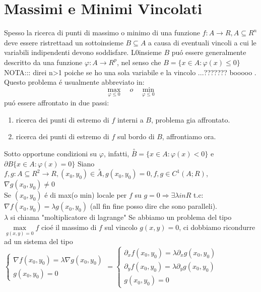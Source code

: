 \section{Massimi e Minimi Vincolati}
Spesso la ricerca di punti di massimo o minimo di una funzione $f:A\rightarrow R, A\subseteq R^n$ deve essere ristrettaad un sottoinsieme $B\subseteq A$ a causa di eventuali vincoli a cui le variabili indipendenti devono soddisfare. L0insieme $B$ pu\'o essere generalmente descritto da una funzione $\varphi :A\rightarrow R^p$, nel senso che $B=\{x\in A:\varphi (x)\le 0\}$\\
NOTA::: direi n>1 poiche se ho una sola variabile e la vincolo ...??????? booooo .\\
Questo problema \'e usualmente abbreviato in:
$$\max\limits_{\varphi \le 0}\quad o \quad\min\limits_{\varphi \le 0}$$
pu\'o essere affrontato in due passi:\\
\begin{enumerate}
	\item ricerca dei punti di estremo di $f$ interni a $B$, problema gia affrontato.
	\item ricerca dei punti di estremo di $f$ sul bordo di $B$, affrontiamo ora.
\end{enumerate}
Sotto opportune condizioni su $\varphi$, infatti, $\overset{\circ}{B} = \{x\in A:\varphi(x)<0\}$ e $\partial B\{x\in A:\varphi(x)=0\}$
Siano $f,g:A\subseteq R^2\rightarrow R, (x_0,y_0)\in\overset{\circ}{A}, g(x_0,y_0)=0, f,g\in C^1(A;R)$, $\nabla g (x_0,y_0)\ne 0$\\
Se $(x_0,y_0)$ \'e di max(o min) locale per $f$ su $g=0\Rightarrow\exists \lambda in R$ t.c: $\nabla f(x_0,y_0) = \lambda g(x_0,y_0)$ (all fin fine posso dire che sono paralleli).\\
\observation
$\lambda$ si chiama "moltiplicatore di lagrange"
\observation
Se abbiamo un problema del tipo $\max\limits_{g(x,y)=0}f$ cio\'e il massimo di $f$ sul vincolo $g(x,y)=0$, ci dobbiamo ricondurre ad un sistema del tipo
$\begin{cases} \nabla f(x_0,y_0)=\lambda \nabla g(x_0,y_0)\\ g(x_0,y_0)=0 \end{cases}=\begin{cases} \partial_xf(x_0,y_0)=\lambda \partial_xg(x_0,y_0)\\\partial_yf(x_0,y_0)=\lambda \partial_yg(x_0,y_0)\\ g(x_0,y_0)=0 \end{cases}$\\
